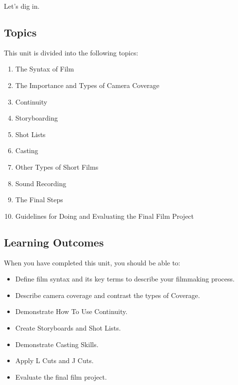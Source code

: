 \documentclass[
]{book}
\providecommand{\tightlist}{%
  \setlength{\itemsep}{0pt}\setlength{\parskip}{0pt}}
\begin{document}
Let's dig in.

\hypertarget{topics-8}{%
\subsection*{Topics}\label{topics-8}}

This unit is divided into the following topics:

\begin{enumerate}
\def\labelenumi{\arabic{enumi}.}
\tightlist
\item
  The Syntax of Film\\
\item
  The Importance and Types of Camera Coverage\\
\item
  Continuity\\
\item
  Storyboarding\\
\item
  Shot Lists\\
\item
  Casting\\
\item
  Other Types of Short Films\\
\item
  Sound Recording\\
\item
  The Final Steps
\item
  Guidelines for Doing and Evaluating the Final Film Project
\end{enumerate}

\hypertarget{learning-outcomes-8}{%
\subsection*{Learning Outcomes}\label{learning-outcomes-8}}

When you have completed this unit, you should be able to:

\begin{itemize}
\tightlist
\item
  Define film syntax and its key terms to describe your filmmaking process.\\
\item
  Describe camera coverage and contrast the types of Coverage.\\
\item
  Demonstrate How To Use Continuity.\\
\item
  Create Storyboards and Shot Lists.\\
\item
  Demonstrate Casting Skills.\\
\item
  Apply L Cuts and J Cuts.\\
\item
  Evaluate the final film project.
\end{itemize}
\end{document}
